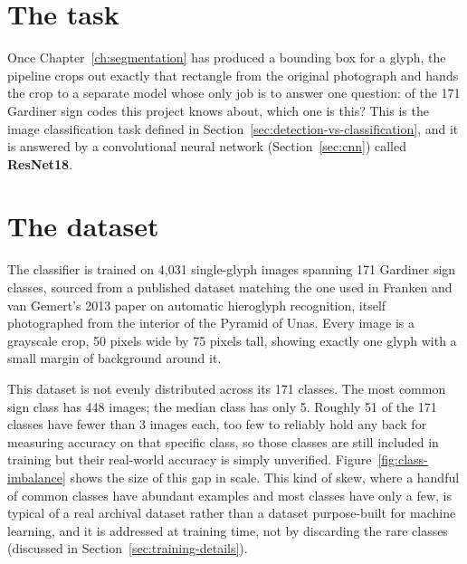 \documentclass[11pt,a4paper]{report}
\begin{document}
\section{The task}

Once Chapter~\ref{ch:segmentation} has produced a bounding box for a glyph,
the pipeline crops out exactly that rectangle from the original photograph
and hands the crop to a separate model whose only job is to answer one
question: of the 171 Gardiner sign codes this project knows about, which one
is this? This is the image classification task defined in
Section~\ref{sec:detection-vs-classification}, and it is answered by a
convolutional neural network (Section~\ref{sec:cnn}) called
\textbf{ResNet18}.

\section{The dataset}
\label{sec:the-dataset}

The classifier is trained on 4{,}031 single-glyph images spanning 171
Gardiner sign classes, sourced from a published dataset matching the one
used in Franken and van Gemert's 2013 paper on automatic hieroglyph
recognition, itself photographed from the interior of the Pyramid of Unas.
Every image is a grayscale crop, 50 pixels wide by 75 pixels tall, showing
exactly one glyph with a small margin of background around it.

This dataset is not evenly distributed across its 171 classes. The most
common sign class has 448 images; the median class has only 5. Roughly 51 of
the 171 classes have fewer than 3 images each, too few to reliably hold any
back for measuring accuracy on that specific class, so those classes are
still included in training but their real-world accuracy is simply
unverified. Figure~\ref{fig:class-imbalance} shows the size of this gap in
scale. This kind of skew, where a handful of common classes have abundant
examples and most classes have only a few, is typical of a real archival
dataset rather than a dataset purpose-built for machine learning, and it is
addressed at training time, not by discarding the rare classes (discussed
in Section~\ref{sec:training-details}).
\end{document}
